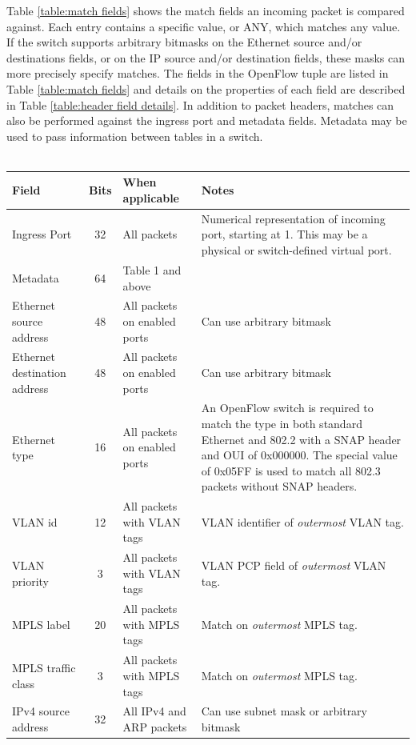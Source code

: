 \documentclass[10pt]{article}
\begin{document}
Table \ref{table:match fields} shows the match fields an incoming packet is compared against. Each entry contains a specific value, or ANY, which matches any value. If the switch supports arbitrary bitmasks on the Ethernet source and/or destinations fields, or on the IP source and/or destination fields, these masks can more precisely specify matches.  The fields in the OpenFlow tuple are listed in Table \ref{table:match fields} and details on the properties of each field are described in Table \ref{table:header field details}. In addition to packet headers, matches can also be performed against the ingress port and metadata fields. Metadata may be used to pass information between tables in a switch.
\\\\
\begin{table}[hbp]
\centering
\footnotesize
\begin{tabularx}{\textwidth}{ |X|c|X|X| }
\hline Field & Bits & When applicable & Notes \\
\hline Ingress Port & 32 & All packets & Numerical representation of incoming port, starting at 1. This may be a physical or switch-defined virtual port. \\
\hline Metadata & 64 & Table 1 and above & \\
\hline Ethernet source address & 48 & All packets on enabled ports & Can use arbitrary bitmask \\
\hline Ethernet destination address & 48 & All packets on enabled ports & Can use arbitrary bitmask \\
\hline Ethernet type & 16 & All packets on enabled ports & An OpenFlow switch is required to match the type in both standard Ethernet and 802.2 with a SNAP header and OUI of 0x000000.  The special value of 0x05FF is used to match all 802.3 packets without SNAP headers. \\
\hline VLAN id & 12 & All packets with VLAN tags & VLAN identifier of \emph{outermost} VLAN tag. \\
\hline VLAN priority & 3 & All packets with VLAN tags & VLAN PCP field of \emph{outermost} VLAN tag. \\
\hline MPLS label & 20 & All packets with MPLS tags & Match on \emph{outermost} MPLS tag. \\
\hline MPLS traffic class & 3 & All packets with MPLS tags & Match on \emph{outermost} MPLS tag. \\
\hline IPv4 source address & 32 & All IPv4 and ARP packets & Can use subnet mask or arbitrary bitmask \\

\end{tabularx}
\end{table}
\end{document}
